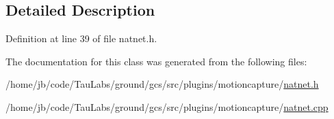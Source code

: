 \subsection{\-Detailed \-Description}


\-Definition at line 39 of file natnet.\-h.



\-The documentation for this class was generated from the following files\-:\begin{DoxyCompactItemize}
\item 
/home/jb/code/\-Tau\-Labs/ground/gcs/src/plugins/motioncapture/\hyperlink{natnet_8h}{natnet.\-h}\item 
/home/jb/code/\-Tau\-Labs/ground/gcs/src/plugins/motioncapture/\hyperlink{natnet_8cpp}{natnet.\-cpp}\end{DoxyCompactItemize}
